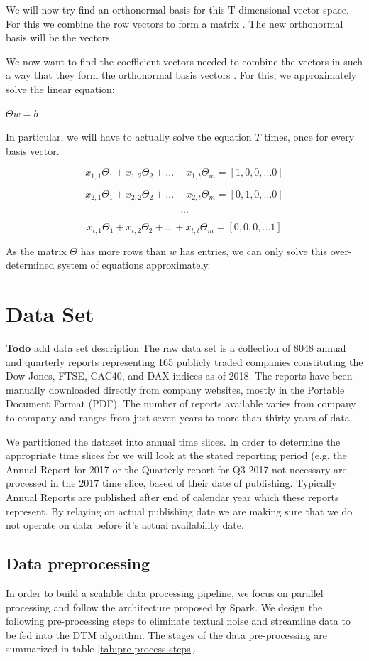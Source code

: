 \documentclass[12pt,journal,letterpaper,oneside,onecolumn]{IEEEtran}
\begin{document}
We will now try find an orthonormal basis for this T-dimensional vector space.
For this we combine the  row vectors to form a matrix .
The new orthonormal basis will be the vectors 

We now want to find the coefficient vectors  needed to combine the vectors in such a way that they form the orthonormal basis vectors .
For this, we approximately solve the linear equation:

$\Theta w = b$

In particular, we will have to actually solve the equation $T$ times, once for every basis vector.

$$x_{1,1} \Theta_1 + x_{1,2} \Theta_2 + ... + x_{1,t} \Theta_m = [1,0,0, ... 0] $$

$$x_{2,1} \Theta_1 + x_{2,2} \Theta_2 + ... + x_{2,t} \Theta_m = [0,1,0, ... 0] $$

$$ ... $$

$$x_{t,1} \Theta_1 + x_{t,2} \Theta_2 + ... + x_{t,t} \Theta_m = [0,0,0, ... 1] $$


As the matrix $\Theta$ has more rows than $w$ has entries, we can only solve this over-determined system of equations approximately.


\section{Data Set}

\textbf{Todo} add data set description
The raw data set is a collection of 8048 annual and quarterly reports representing 165 publicly traded companies constituting the Dow Jones, FTSE, CAC40, and DAX indices as of 2018. The reports have been manually downloaded directly from  company websites, mostly in the Portable Document Format (PDF). The number of reports available varies from company to company and ranges from just seven years to more than thirty years of data. 

We partitioned the dataset into annual time slices. In order to determine the appropriate time slices for we will look at the stated reporting period (e.g. the Annual Report for 2017 or the Quarterly report for Q3 2017 not necessary are processed in the 2017 time slice, based of their date of publishing. Typically Annual Reports are published after end of calendar year which these reports represent. By relaying on actual publishing date we are making sure that we do not operate on data before it's actual availability date.
\subsection{Data preprocessing}
In order to build a scalable data processing pipeline, we focus on parallel processing and follow the architecture proposed by Spark\cite{ref_finnum_spark}. We design the following pre-processing steps to eliminate textual noise and streamline data to be fed into the DTM algorithm. The stages of the data pre-processing are summarized in table \ref{tab:pre-process-steps}. 
\end{document}
